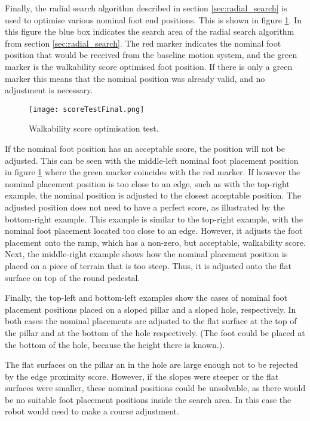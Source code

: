     \noindent
    Finally, the radial search algorithm described in section \ref{sec:radial_search} is used to optimise various nominal foot end positions. This is shown in figure \ref{fig:optimisation_test}. In this figure the blue box indicates the search area of the radial search algorithm from section \ref{sec:radial_search}. The red marker indicates the nominal foot position that would be received from the baseline motion system, and the green marker is the walkability score optimised foot position. If there is only a green marker this means that the nominal position was already valid, and no adjustment is necessary.
    \newpage
    \begin{figure}[h]
        \centering
        \texttt{[image: scoreTestFinal.png]}
        \caption{Walkability score optimisation test.}
        \label{fig:optimisation_test}
    \end{figure}

    \noindent
    If the nominal foot position has an acceptable score, the position will not be adjusted. This can be seen with the middle-left nominal foot placement position in figure \ref{fig:optimisation_test} where the green marker coincides with the red marker. If however the nominal placement position is too close to an edge, such as with the top-right example, the nominal position is adjusted to the closest acceptable position. The adjusted position does not need to have a perfect score, as illustrated by the bottom-right example. This example is similar to the top-right example, with the nominal foot placement located too close to an edge. However, it adjusts the foot placement onto the ramp, which has a non-zero, but acceptable, walkability score. Next, the middle-right example shows how the nominal placement position is placed on a piece of terrain that is too steep. Thus, it is adjusted onto the flat surface on top of the round pedestal. 
    
    Finally, the top-left and bottom-left examples show the cases of nominal foot placement positions placed on a sloped pillar and a sloped hole, respectively. In both cases the nominal placements are adjusted to the flat surface at the top of the pillar and at the bottom of the hole respectively. (The foot could be placed at the bottom of the hole, because the height there is known.).
    
    The flat surfaces on the pillar an in the hole are large enough not to be rejected by the edge proximity score. However, if the slopes were steeper or the flat surfaces were smaller, these nominal positions could be unsolvable, as there would be no suitable foot placement positions inside the search area. In this case the robot would need to make a course adjustment.

